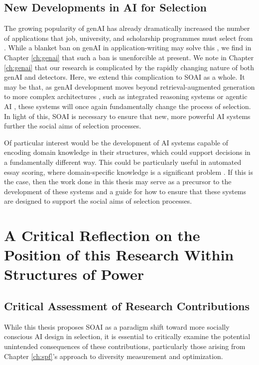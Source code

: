 \subsection{New Developments in AI for Selection}
The growing popularity of genAI has already dramatically increased the number of applications that job, university, and scholarship programmes must select from \cite{Kaashoek2024Impact}. While a blanket ban on genAI in application-writing may solve this \cite{h_holden_thorp_chatgpt_2023}, we find in Chapter \ref{ch:genai} that such a ban is unenforcible at present. We note in Chapter \ref{ch:genai} that our research is complicated by the rapidly changing nature of both genAI and detectors. Here, we extend this complication to SOAI as a whole. It may be that, as genAI development moves beyond retrieval-augmented generation to more complex architectures \cite{lewis2020retrieval}, such as integrated reasoning systems or agentic AI \cite{Shavit_O'Keefe_Eloundou_McMillan_Agarwal_Brundage_Adler_Campbell_Lee_Mishkin_et}, these systems will once again fundamentally change the process of selection. In light of this, SOAI is necessary to ensure that new, more powerful AI systems further the social aims of selection processes.

Of particular interest would be the development of AI systems capable of encoding domain knowledge in their structures, which could support decisions in a fundamentally different way. This could be particularly useful in automated essay scoring, where domain-specific knowledge is a significant problem \cite{elijahthesis}. If this is the case, then the work done in this thesis may serve as a precursor to the development of these systems and a guide for how to ensure that these systems are designed to support the social aims of selection processes.

\section{A Critical Reflection on the Position of this Research Within Structures of Power}\label{sec:reflexivity}

\subsection{Critical Assessment of Research Contributions}
While this thesis proposes SOAI as a paradigm shift toward more socially conscious AI design in selection, it is essential to critically examine the potential unintended consequences of these contributions, particularly those arising from Chapter \ref{ch:spf}'s approach to diversity measurement and optimization.

